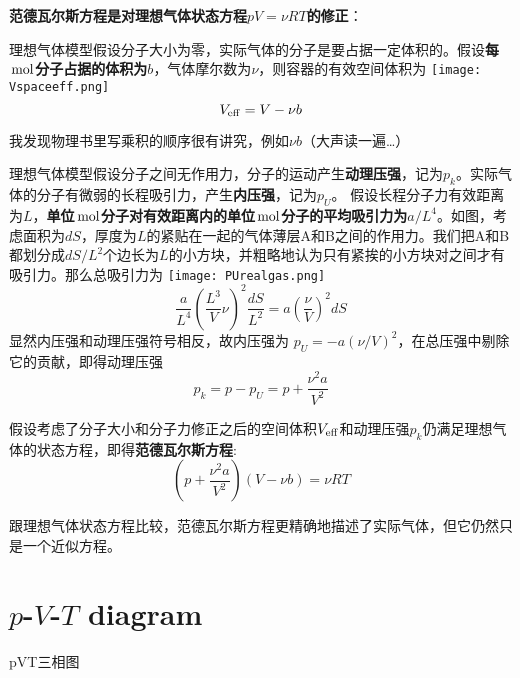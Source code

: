 \documentclass[CJK]{beamer}
\begin{document}
\begin{frame}
\bch
{\bf 范德瓦尔斯方程是对理想气体状态方程$pV = \nu RT$的修正}：
\bitem
\item{理想气体模型假设分子大小为零，实际气体的分子是要占据一定体积的。假设{\bf 每$\,\mathrm{mol}$分子占据的体积为$b$}，气体摩尔数为$\nu$，则容器的有效空间体积为
\texttt{[image: Vspaceeff.png]}
\emini
{}
$$ V_{\rm eff} = V - \nu b$$

\skipline

我发现物理书里写乘积的顺序很有讲究，例如$\nu b$（大声读一遍…）
\emini
}
\eitem
\ech
\end{frame}



\begin{frame}
\bch
\bitem
\item{\small 理想气体模型假设分子之间无作用力，分子的运动产生{\bf 动理压强}，记为$p_k$。实际气体的分子有微弱的长程吸引力，产生{\bf 内压强}，记为$p_U$。
假设长程分子力有效距离为$L$，{\bf 单位$\,\mathrm{mol}$分子对有效距离内的单位$\,\mathrm{mol}$分子的平均吸引力为$a/L^4$}。如图，考虑面积为$dS$，厚度为$L$的紧贴在一起的气体薄层A和B之间的作用力。我们把A和B都划分成$dS/L^2$个边长为$L$的小方块，并粗略地认为只有紧挨的小方块对之间才有吸引力。那么总吸引力为}
\eitem
{}
\texttt{[image: PUrealgas.png]}
\emini
{}
{\small  
$$ \frac{a}{L^4}\left(\frac{L^3}{V}\nu\right)^2 \frac{dS}{L^2} = a \left(\frac{\nu}{V}\right)^2 dS$$
显然内压强和动理压强符号相反，故内压强为 $p_U = - a(\nu/V)^2$，在总压强中剔除它的贡献，即得动理压强
$$p_k = p - p_U = p + \frac{\nu^2 a}{V^2}$$
}
\emini
\ech
\end{frame}

\begin{frame}
\bch
假设考虑了分子大小和分子力修正之后的空间体积$V_{\rm eff}$和动理压强$p_k$仍满足理想气体的状态方程，即得{\bf 范德瓦尔斯方程}:
$$ \left(p+\frac{\nu^2 a}{V^2}\right)\left(V - \nu b\right) = \nu R T$$

跟理想气体状态方程比较，范德瓦尔斯方程更精确地描述了实际气体，但它仍然只是一个近似方程。
\ech
\end{frame}


\section{$p$-$V$-$T$ diagram}


\begin{frame}
  \bch
  \begin{center}
    \Huge{pVT三相图}
    \end{center}    
\ech
\end{frame}
\end{document}
